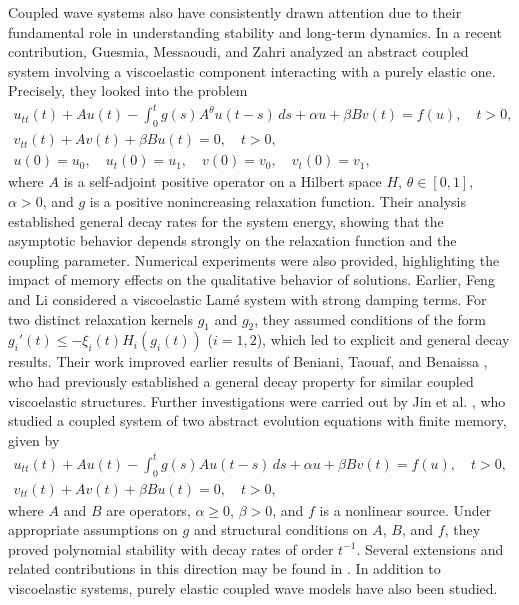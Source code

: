 \documentclass[11pt]{article}
\numberwithin{equation}{section}
\begin{document}
Coupled wave systems also have consistently drawn attention due to their fundamental role in understanding stability and long-term dynamics. In a recent contribution, Guesmia, Messaoudi, and Zahri \cite{GASM} analyzed an abstract coupled system involving a viscoelastic component interacting with a purely elastic one. Precisely, they looked into the problem
\begin{gather*}
u_{tt}(t) + Au(t) - \int_0^{t} g(s) A^{\theta} u(t - s) \, ds + \alpha u + \beta B v(t) = f(u), \quad t > 0, \\
v_{tt}(t) + A v(t) + \beta B u(t) = 0, \quad t > 0,\\
u(0) = u_0, \quad u_t(0) = u_1, \quad v(0) = v_0, \quad v_t(0) = v_1,
\end{gather*}
 where $A$ is a self-adjoint positive operator on a Hilbert space $H$, $\theta \in [0,1]$,
 $\alpha > 0$, and $g$ is a positive nonincreasing relaxation function.
 Their analysis established general decay rates for the system energy, showing that the
 asymptotic behavior depends strongly on the relaxation function and the coupling parameter.
 Numerical experiments were also provided, highlighting the impact of memory effects on
 the qualitative behavior of solutions. Earlier, Feng and Li \cite{FengBaoweiHaiyan} considered
 a viscoelastic Lam\'e system with strong damping terms. For two distinct relaxation kernels
 $g_1$ and $g_2$, they assumed conditions of the form $g_i'(t) \leq -\xi_i(t) H_i(g_i(t))$
 ($i=1,2$), which led to explicit and general decay results. Their work improved earlier results
 of Beniani, Taouaf, and Benaissa \cite{Beniani}, who had previously established a general
 decay property for similar coupled viscoelastic structures.
Further investigations were carried out by Jin et al. \cite{JKJT}, who studied a coupled system of two abstract evolution equations with finite memory, given by
\begin{gather*}
 u_{tt}(t) + Au(t) - \int_0^{t} g(s) A u(t - s) \, ds + \alpha u + \beta B v(t)
 = f(u), \quad t > 0, \\
v_{tt}(t) + A v(t) + \beta B u(t) = 0, \quad t > 0,
 \end{gather*}
 where $A$ and $B$ are operators, $\alpha \geq 0$, $\beta > 0$, and $f$ is a nonlinear source.
 Under appropriate assumptions on $g$ and structural conditions on $A$, $B$, and $f$,
 they proved polynomial stability with decay rates of order $t^{-1}$. Several extensions and
related contributions in this direction may be found in \cite{ ORHC, AkilM}.
In addition to viscoelastic systems, purely elastic coupled wave models have also been studied.
\end{document}
